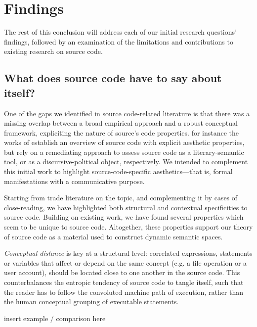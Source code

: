 \section{Findings}
\label{sec:findings}

The rest of this conclusion will address each of our initial research questions' findings, followed by an examination of the limitations and contributions to existing research on source code.

\subsection{What does source code have to say about itself?}
\label{subsec:conclusion-rq-1}

One of the gaps we identified in source code-related literature is that there was a missing overlap between a broad empirical approach and a robust conceptual framework, expliciting the nature of source's code properties. for instance the works of \citep{paloque-berges_poetique_2009,cox_speaking_2013} establish an overview of source code with explicit aesthetic properties, but rely on a remediating approach to assess source code as a literary-semantic tool, or as a discursive-political object, respectively. We intended to complement this initial work to highlight source-code-specific aesthetics—that is, formal manifestations with a communicative purpose.

Starting from trade literature on the topic, and complementing it by cases of close-reading, we have highlighted both structural and contextual specificities to source code. Building on existing work, we have found several properties which seem to be unique to source code. Altogether, these properties support our theory of source code as a material used to construct dynamic semantic spaces.

\emph{Conceptual distance} is key at a structural level: correlated expressions, statements or variables that affect or depend on the same concept (e.g. a file operation or a user account), should be located close to one another in the source code. This counterbalances the entropic tendency of source code to tangle itself, such that the reader has to follow the convoluted machine path of execution, rather than the human conceptual grouping of executable statements.

\begin{listing}
    insert example / comparison here
\end{listing}

